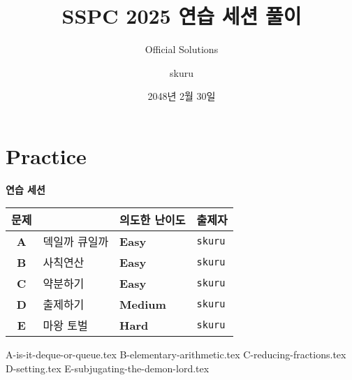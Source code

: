 
\usetikzlibrary{arrows.meta,matrix,decorations.pathreplacing}

\title{SSPC 2025 연습 세션 풀이}
\subtitle{Official Solutions}
\author{skuru}
\date{2048년 2월 30일}


\setcounter{framenumber}{-1}
\frame{\titlepage}

\section{Practice}
\begin{frame}
    {\huge {} \color{main-color} \textbf{연습 세션}}
    \vspace{3mm}
    \begin{center}
        \begin{tabular}{cl|l|l}
            \hline
            문제         &      & 의도한 난이도                         & 출제자            \\
            \hline
            \hline
            \textbf{A} & 덱일까 큐일까 & \textbf{\color{acbronze}Easy}   & \texttt{skuru} \\
            \textbf{B} & 사칙연산 & \textbf{\color{acbronze}Easy}   & \texttt{skuru} \\
            \textbf{C} & 약분하기 & \textbf{\color{acbronze}Easy}   & \texttt{skuru} \\
            \textbf{D} & 출제하기 & \textbf{\color{acgold}Medium} & \texttt{skuru} \\
            \textbf{E} & 마왕 토벌 & \textbf{\color{acplatinum}Hard} & \texttt{skuru} \\
            \hline
        \end{tabular}
    \end{center}
\end{frame}

{A-is-it-deque-or-queue.tex}
{B-elementary-arithmetic.tex}
{C-reducing-fractions.tex}
{D-setting.tex}
{E-subjugating-the-demon-lord.tex}

